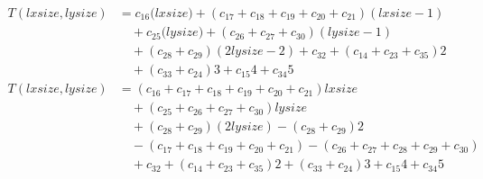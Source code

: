 \begin{subequations}
\label{eq:analyse-arlabeling-init}
\begin{align}
\label{eq:analyse-arlabeling-init-1}
T(\mathit{lxsize},\mathit{lysize})& = c_{16}\bigl(\mathit{lxsize}\bigr) + (c_{17} + c_{18} + c_{19} + c_{20} + c_{21})
(\mathit{lxsize} - 1) \\
& \quad  + c_{25}\bigl(\mathit{lysize}\bigr) + (c_{26} + c_{27} +  c_{30})(\mathit{lysize} - 1) \nonumber \\
& \quad + (c_{28} + c_{29})(2\mathit{lysize} - 2) + c_{32} + (c_{14} + c_{23} + c_{35})2 \nonumber \\
& \quad + (c_{33} + c_{24})3 + c_{15}4 + c_{34}5 \nonumber \\
\label{eq:analyse-arlabeling-init-2}
T(\mathit{lxsize},\mathit{lysize})& = (c_{16} + c_{17} + c_{18} + c_{19} + c_{20} + c_{21})\mathit{lxsize} \\
& \quad + (c_{25} + c_{26} + c_{27} + c_{30})\mathit{lysize} \nonumber \\
& \quad + (c_{28} + c_{29})(2\mathit{lysize}) - (c_{28} + c_{29})2 \nonumber \\
& \quad - (c_{17} + c_{18} + c_{19} + c_{20} + c_{21})  - (c_{26} + c_{27} + c_{28} + c_{29} + c_{30})  \nonumber \\
& \quad + c_{32} + (c_{14} + c_{23} + c_{35})2 + (c_{33} + c_{24})3 + c_{15}4 + c_{34}5 \nonumber
\end{align}
\end{subequations}
